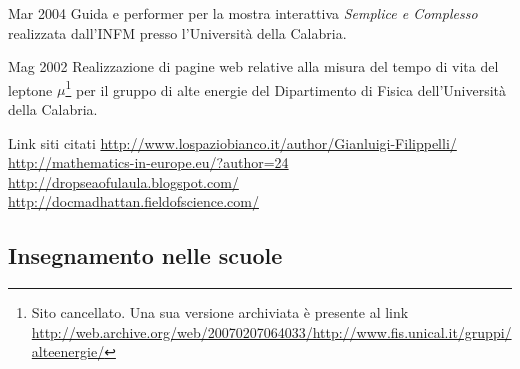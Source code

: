 \begin{CV}
	\item[Mar 2004] Guida e performer per la mostra interattiva {\em Semplice e Complesso} realizzata dall'INFM presso l'Università della Calabria.
	
	\item[Mag 2002] Realizzazione di pagine web relative alla misura del tempo di vita del leptone $\mu$\footnote{Sito cancellato. Una sua versione archiviata è presente al link \href{http://web.archive.org/web/20070207064033/http://www.fis.unical.it/gruppi/alteenergie/}{http://web.archive.org/web/20070207064033/http://www.fis.unical.it/gruppi/alteenergie/}} per il gruppo di alte energie del Dipartimento di Fisica dell'Università della Calabria.
	
	\item[Link siti citati] \href{http://www.lospaziobianco.it/author/Gianluigi-Filippelli/}{http://www.lospaziobianco.it/author/Gianluigi-Filippelli/}\\
	\href{http://mathematics-in-europe.eu/?author=24}{http://mathematics-in-europe.eu/?author=24}\\
	\href{http://dropseaofulaula.blogspot.com/}{http://dropseaofulaula.blogspot.com/}\\
	\href{http://docmadhattan.fieldofscience.com/}{http://docmadhattan.fieldofscience.com/}
	
\end{CV}

\subsection*{Insegnamento nelle scuole}

